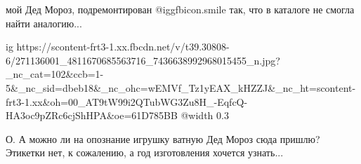 


мой Дед Мороз, подремонтирован  @igg{fbicon.smile}  так, что в каталоге не смогла найти
аналогию...

\ifcmt
  ig https://scontent-frt3-1.xx.fbcdn.net/v/t39.30808-6/271136001_4811670685563716_7436638992968015455_n.jpg?_nc_cat=102&ccb=1-5&_nc_sid=dbeb18&_nc_ohc=wEMVf_Tz1yEAX_kHZZJ&_nc_ht=scontent-frt3-1.xx&oh=00_AT9tW99i2QTubWG3Zu8H_-EqfcQ-HA3oc9pZRc6cjShHPA&oe=61D785BB
  @width 0.3
\fi


О. А можно ли на опознание игрушку ватную Дед Мороз сюда пришлю? Этикетки нет,
к сожалению, а год изготовления хочется узнать...
